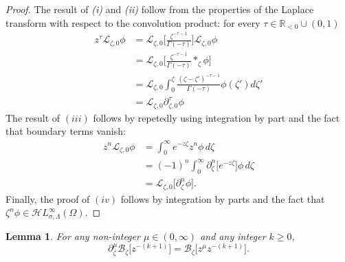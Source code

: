 \documentclass{article}
\newcommand{\singexp}[2]{\mathcal{H}L^\infty_{#1, #2}}
\newcommand{\R}{\mathbb{R}}
\newcommand{\fracderiv}[3]{\partial^{#1}_{#2, #3}}
\newcommand{\laplace}{\mathcal{L}}
\newcommand{\borel}{\mathcal{B}}
\theoremstyle{definition}
\theoremstyle{plain}
\newtheorem{lemma}[definition]{Lemma}
\begin{document}
\begin{proof}
   
   The result of \emph{(i)} and \emph{(ii)} follow from the properties of the Laplace transform with respect to the convolution product: for every $\tau\in\R_{<0}\cup(0,1)$
    \begin{align*}
        z^\tau\laplace_{\zeta,0}\phi&=\laplace_{\zeta,0}\Big[\frac{\zeta^{-\tau-1}}{\Gamma(-\tau)}\Big] \laplace_{\zeta,0}\phi\\
        &=\laplace_{\zeta,0}\Big[\frac{\zeta^{-\tau-1}}{\Gamma(-\tau)} \ast_\zeta \phi\Big] \\
        &=\laplace_{\zeta,0} \int_0^{\zeta}\frac{(\zeta-\zeta')^{-\tau-1}}{\Gamma(-\tau)} \phi(\zeta') d\zeta'\\
        &=\laplace_{\zeta,0}\fracderiv{\tau}{\zeta}{0}\phi
        \end{align*}
        The result of $(iii)$ follows by repetedly using integration by part and the fact that boundary terms vanish:
\begin{align*}
    z^n\laplace_{\zeta,0}\phi&=\int_0^\infty e^{-z\zeta} z^n \phi \, d\zeta\\
    &=(-1)^n\int_0^\infty \partial_\zeta^n \big[e^{-z\zeta}\big]  \phi\, d\zeta\\
    &=\laplace_{\zeta,0}\big[\partial_\zeta^n \phi\big].
\end{align*}
     Finally, the proof of $(iv)$ follows by integration by parts and the fact that $\zeta^n\phi\in\singexp{\sigma}{\Lambda}(\Omega)$.   
\end{proof}
\begin{lemma}\label{lem:frac-deriv-Borel}
For any non-integer $\mu \in (0, \infty)$ and any integer $k \ge 0$,
\[ \partial^\mu_{\zeta } \borel_\zeta \big[z^{-(k+1)}\big] =  \borel_\zeta \big[z^\mu z^{-(k+1)}\big]. \]
\end{lemma}
\end{document}
